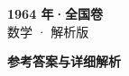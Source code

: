 \documentclass[zihao=-4, a4paper]{ctexart}
\begin{document}
\begin{center}
  {\Large\bfseries 1964 年·全国卷}\\[4pt]
  {\large 数学 · 解析版}
\end{center}
\medskip
{}

\clearpage
{}
\begin{center}{\Large\bfseries 参考答案与详细解析}\end{center}
\medskip

\end{document}
